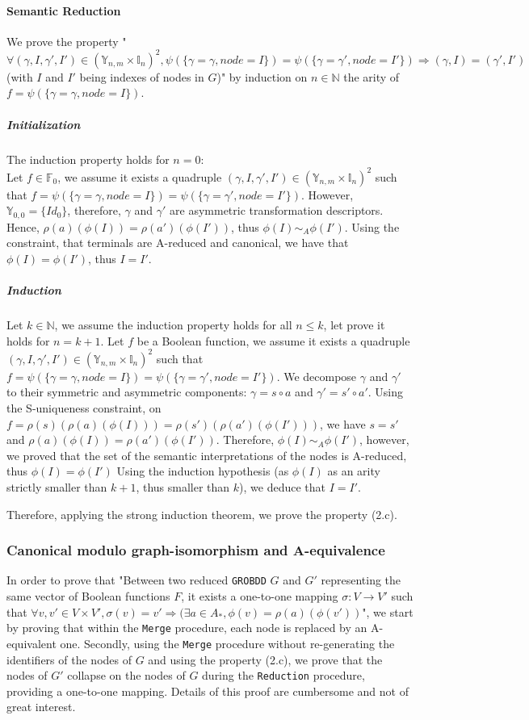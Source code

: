 \documentclass[a4paper,10pt]{article}
\newcommand{\N}{\mathbb{N}}%
\newcommand{\F}{\mathbb{F}}
\newcommand{\Y}{\mathbb{Y}}
\newcommand{\I}{\mathbb{I}}
\newcommand{\GroBdd}{\texttt{GROBDD}}
\begin{document}
\paragraph{Semantic Reduction}
We prove the property "$\forall (\gamma, I, \gamma', I') \in (\Y_{n, m} \times \I_n)^2, \psi(\{\gamma = \gamma, node = I\}) = \psi(\{\gamma = \gamma', node = I'\}) \Rightarrow (\gamma, I) = (\gamma', I')$ (with $I$ and $I'$ being indexes of nodes in $G$)" by induction on $n\in\N$ the arity of $f = \psi(\{\gamma = \gamma, node = I\})$.

\subparagraph{Initialization}
The induction property holds for $n = 0$:\\
Let $f\in\F_0$, we assume it exists a quadruple $(\gamma, I, \gamma', I') \in (\Y_{n, m} \times \I_n)^2$ such that $f = \psi(\{\gamma = \gamma, node = I\}) = \psi(\{\gamma = \gamma', node = I'\})$.
However, $\Y_{0, 0} = \{Id_0\}$, therefore, $\gamma$ and $\gamma'$ are asymmetric transformation descriptors.
Hence, $\rho(a)(\phi(I)) = \rho(a')(\phi(I'))$, thus $\phi(I) \sim_A \phi(I')$.
Using the constraint, that terminals are A-reduced and canonical, we have that $\phi(I) = \phi(I')$, thus $I = I'$.

\subparagraph{Induction}
Let $k\in\N$, we assume the induction property holds for all $n\leq k$, let prove it holds for $n = k+1$.
Let $f$ be a Boolean function, we assume it exists a quadruple $(\gamma, I, \gamma', I') \in (\Y_{n, m} \times \I_n)^2$ such that $f = \psi(\{\gamma = \gamma, node = I\}) = \psi(\{\gamma = \gamma', node = I'\})$.
We decompose $\gamma$ and $\gamma'$ to their symmetric and asymmetric components: $\gamma = s \circ a$ and $\gamma' = s' \circ a'$.
Using the S-uniqueness constraint, on $f = \rho(s)(\rho(a)(\phi(I))) = \rho(s')(\rho(a')(\phi(I')))$, we have $s = s'$ and $\rho(a)(\phi(I)) = \rho(a')(\phi(I'))$.
Therefore, $\phi(I) \sim_A \phi(I')$, however, we proved that the set of the semantic interpretations of the nodes is A-reduced, thus $\phi(I) = \phi(I')$
Using the induction hypothesis (as $\phi(I)$ as an arity strictly smaller than $k+1$, thus smaller than $k$), we deduce that $I = I'$.

Therefore, applying the strong induction theorem, we prove the property (2.c).

\subsubsection{Canonical modulo graph-isomorphism and A-equivalence}
In order to prove that "Between two reduced \GroBdd{} $G$ and $G'$ representing the same vector of Boolean functions $F$, it exists a one-to-one mapping $\sigma : V \longrightarrow V'$ such that $\forall v, v' \in V \times V', \sigma(v) = v' \Rightarrow (\exists a \in A_{*}, \phi(v) = \rho(a)(\phi(v'))$", we start by proving that within the \texttt{Merge} procedure, each node is replaced by an A-equivalent one.
Secondly, using the \texttt{Merge} procedure without re-generating the identifiers of the nodes of $G$ and using the property (2.c), we prove that the nodes of $G'$ collapse on the nodes of $G$ during the \texttt{Reduction} procedure, providing a one-to-one mapping.
Details of this proof are cumbersome and not of great interest.
\end{document}

